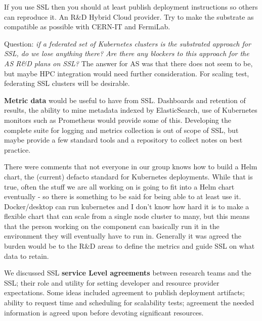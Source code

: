 \documentclass[11pt,letterpaper,fleqn]{article}
\begin{document}
If you use SSL then you should at least publish deployment instructions so others can reproduce it. An R\&D Hybrid Cloud provider. Try to make the substrate as compatible as possible with CERN-IT and FermiLab.

Question: {\it if a federated set of Kubernetes clusters is the substrated approach for SSL, do we lose anything there? Are there any blockers to this approach for the AS R\&D plans on SSL?}  The answer for AS was that there does not seem to be, but maybe HPC integration would need further consideration. For scaling test, federating SSL clusters will be desirable.

{\bf Metric data} would be useful to have from SSL.  Dashboards and retention of results, the ability to mine metadata indexed by ElasticSearch, use of Kubernetes monitors such as Prometheus would provide some of this.  Developing the complete suite for logging and metrics collection is out of scope of SSL, but maybe provide a few standard tools and a repository to collect notes on best practice.

There were comments that not everyone in our group knows how to build a Helm chart, the (current) defacto standard for Kubernetes deployments. While that is true, often the stuff we are all working on is going to fit into a Helm chart eventually - so there is something to be said for being able to at least use it. Docker/desktop can run kubernetes and I don’t know how hard it is to make a flexible chart that can scale from a single node cluster to many, but this means that the person working on the component can basically run it in the environment they will eventually have to run in. Generally it was agreed the burden would be to the R\&D areas to define the metrics and guide SSL on what data to retain.

We discussed SSL {\bf service Level agreements} between research teams and the SSL; their role and utility for setting developer and resource provider expectations.  Some ideas included agreement to publish deployment artifacts; ability to request time and scheduling for scalability tests;  agreement the needed information is agreed upon before devoting significant resources.
\end{document}
